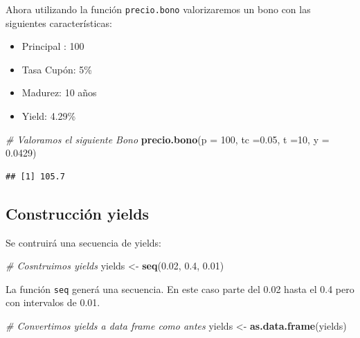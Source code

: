 \documentclass[12pt,]{book}
\newenvironment{Shaded}{\begin{snugshade}}{\end{snugshade}}
\newcommand{\KeywordTok}[1]{\textcolor[rgb]{0.13,0.29,0.53}{\textbf{#1}}}
\newcommand{\DataTypeTok}[1]{\textcolor[rgb]{0.13,0.29,0.53}{#1}}
\newcommand{\DecValTok}[1]{\textcolor[rgb]{0.00,0.00,0.81}{#1}}
\newcommand{\FloatTok}[1]{\textcolor[rgb]{0.00,0.00,0.81}{#1}}
\newcommand{\StringTok}[1]{\textcolor[rgb]{0.31,0.60,0.02}{#1}}
\newcommand{\CommentTok}[1]{\textcolor[rgb]{0.56,0.35,0.01}{\textit{#1}}}
\newcommand{\NormalTok}[1]{#1}
\providecommand{\tightlist}{%
  \setlength{\itemsep}{0pt}\setlength{\parskip}{0pt}}
\begin{document}
Ahora utilizando la función \texttt{precio.bono} valorizaremos un bono
con las siguientes características:

\begin{itemize}
\tightlist
\item
  Principal : 100
\item
  Tasa Cupón: 5\%
\item
  Madurez: 10 años
\item
  Yield: 4.29\%
\end{itemize}

\begin{Shaded}
\begin{Highlighting}[]
\CommentTok{# Valoramos el siguiente Bono}
\KeywordTok{precio.bono}\NormalTok{(}\DataTypeTok{p =} \DecValTok{100}\NormalTok{, }\DataTypeTok{tc =}\FloatTok{0.05}\NormalTok{, }\DataTypeTok{t =}\DecValTok{10}\NormalTok{, }\DataTypeTok{y =} \FloatTok{0.0429}\NormalTok{)}
\end{Highlighting}
\end{Shaded}

\begin{verbatim}
## [1] 105.7
\end{verbatim}

\subsection{Construcción yields}\label{construccion-yields}

Se contruirá una secuencia de yields:

\begin{Shaded}
\begin{Highlighting}[]
\CommentTok{# Cosntruimos yields }
\NormalTok{yields <-}\StringTok{ }\KeywordTok{seq}\NormalTok{(}\FloatTok{0.02}\NormalTok{, }\FloatTok{0.4}\NormalTok{, }\FloatTok{0.01}\NormalTok{)}
\end{Highlighting}
\end{Shaded}

La función \texttt{seq} generá una secuencia. En este caso parte del
0.02 hasta el 0.4 pero con intervalos de 0.01.

\begin{Shaded}
\begin{Highlighting}[]
\CommentTok{# Convertimos yields a data frame como antes }
\NormalTok{yields <-}\StringTok{ }\KeywordTok{as.data.frame}\NormalTok{(yields)}
\end{Highlighting}
\end{Shaded}
\end{document}
